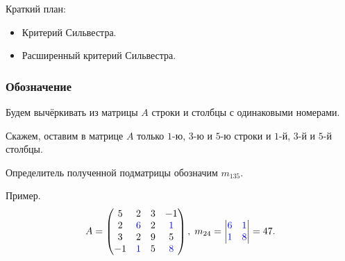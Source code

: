 
\begin{frame} %


\end{frame}



\begin{frame}{Краткий план:}
  \begin{itemize}[<+->]
    \item Критерий Сильвестра.
    \item Расширенный критерий Сильвестра.
  \end{itemize}

\end{frame}


\begin{frame}
    \frametitle{Обозначение}

    Будем вычёркивать из матрицы $A$ строки и столбцы с одинаковыми номерами.\pause

    Скажем, оставим в матрице $A$ только $1$-ю, $3$-ю и $5$-ю строки и 
    $1$-й, $3$-й и $5$-й столбцы. \pause

    Определитель полученной подматрицы обозначим $m_{135}$. \pause

    Пример. 
    \[
    A = \begin{pmatrix}
        5 & 2 & 3 & -1 \\
        2 & \textcolor{blue}{6} & 2 & \textcolor{blue}{1} \\
        3 & 2 & 9 & 5 \\
        -1 & \textcolor{blue}{1} & 5 & \textcolor{blue}{8} \\
    \end{pmatrix}, \; m_{24} = \begin{vmatrix}
        \textcolor{blue}{6} & \textcolor{blue}{1} \\
        \textcolor{blue}{1} & \textcolor{blue}{8} \\
    \end{vmatrix} = 47.
    \]
    
\end{frame}


